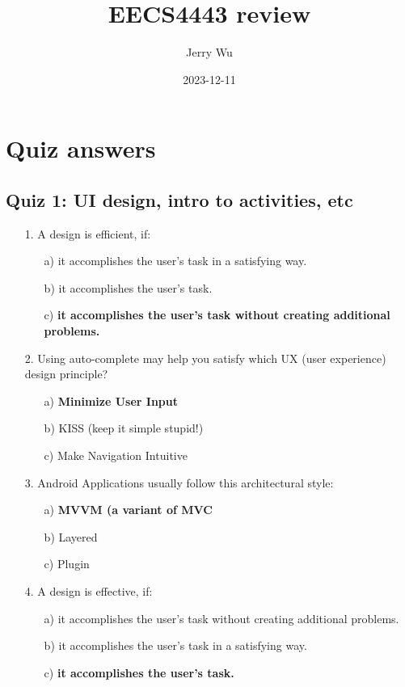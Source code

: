\documentclass[12pt]{article}
\title{EECS4443 review}
\author{Jerry Wu}
\date{2023-12-11}
\begin{document}
\maketitle

\section*{Quiz answers}

\subsection*{Quiz 1: UI design, intro to activities, etc}

\begin{itemize}
    \item[1.] A design is efficient, if:
    \begin{itemize}
        \item[a)] it accomplishes the user's task in a satisfying way.
        \item[b)] it accomplishes the user's task.
        \item[c)] \textbf{it accomplishes the user's task without creating additional problems.}

    \end{itemize}
    \item[2.] Using auto-complete may help you satisfy which UX (user experience) design principle?
    \begin{itemize}
        \item[a)] \textbf{Minimize User Input}
        \item[b)] KISS (keep it simple stupid!)
        \item[c)] Make Navigation Intuitive
    \end{itemize}
    
    \item[3.] Android Applications usually follow this architectural style:
    \begin{itemize}
        \item[a)] \textbf{MVVM (a variant of MVC}
        \item[b)] Layered
        \item[c)] Plugin
    \end{itemize}
    
    \item[4.] A design is effective, if:
    \begin{itemize}
        \item[a)] it accomplishes the user's task without creating additional problems.
        \item[b)] it accomplishes the user's task in a satisfying way.
        \item[c)] \textbf{it accomplishes the user's task.}
    \end{itemize}
    

\end{itemize}
\end{document}
